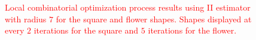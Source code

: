 \documentclass[smallextended]{svjour3}       %
\newcommand{\revision}[1]{\textcolor{red}{#1}}
\begin{document}
\begin{figure}[!h]
{	}%
	\hspace{10pt}
	\hspace{10pt}
		\caption{\revision{Local combinatorial optimization process results using II estimator with radius $7$ for the square and flower shapes. Shapes displayed at every $2$ iterations for the square and $5$ iterations for the flower.}}	
		\label{fig:local-comb-square-results}
\end{figure}
\end{document}

